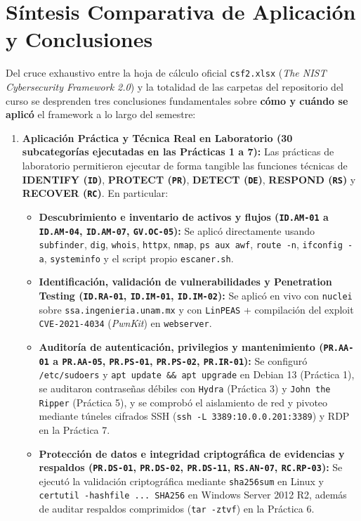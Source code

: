 \documentclass[letterpaper,11pt]{article}
\begin{document}
\section{Síntesis Comparativa de Aplicación y Conclusiones}

Del cruce exhaustivo entre la hoja de cálculo oficial \texttt{csf2.xlsx} (\textit{The NIST Cybersecurity Framework 2.0}) y la totalidad de las carpetas del repositorio del curso se desprenden tres conclusiones fundamentales sobre \textbf{cómo y cuándo se aplicó} el framework a lo largo del semestre:

\begin{enumerate}[leftmargin=1.1cm, itemsep=4pt]
    \item \textbf{Aplicación Práctica y Técnica Real en Laboratorio (\textbf{30 subcategorías} ejecutadas en las Prácticas 1 a 7):}
    Las prácticas de laboratorio permitieron ejecutar de forma tangible las funciones técnicas de \textbf{IDENTIFY (\texttt{ID})}, \textbf{PROTECT (\texttt{PR})}, \textbf{DETECT (\texttt{DE})}, \textbf{RESPOND (\texttt{RS})} y \textbf{RECOVER (\texttt{RC})}. En particular:
    \begin{itemize}[leftmargin=0.8cm, itemsep=2pt]
        \item \textbf{Descubrimiento e inventario de activos y flujos (\texttt{ID.AM-01} a \texttt{ID.AM-04}, \texttt{ID.AM-07}, \texttt{GV.OC-05}):} Se aplicó directamente usando \texttt{subfinder}, \texttt{dig}, \texttt{whois}, \texttt{httpx}, \texttt{nmap}, \texttt{ps aux awf}, \texttt{route -n}, \texttt{ifconfig -a}, \texttt{systeminfo} y el script propio \texttt{escaner.sh}.
        \item \textbf{Identificación, validación de vulnerabilidades y Penetration Testing (\texttt{ID.RA-01}, \texttt{ID.IM-01}, \texttt{ID.IM-02}):} Se aplicó en vivo con \texttt{nuclei} sobre \texttt{ssa.ingenieria.unam.mx} y con \texttt{LinPEAS} + compilación del exploit \texttt{CVE-2021-4034} (\textit{PwnKit}) en \texttt{webserver}.
        \item \textbf{Auditoría de autenticación, privilegios y mantenimiento (\texttt{PR.AA-01} a \texttt{PR.AA-05}, \texttt{PR.PS-01}, \texttt{PR.PS-02}, \texttt{PR.IR-01}):} Se configuró \texttt{/etc/sudoers} y \texttt{apt update \&\& apt upgrade} en Debian 13 (Práctica 1), se auditaron contraseñas débiles con \texttt{Hydra} (Práctica 3) y \texttt{John the Ripper} (Práctica 5), y se comprobó el aislamiento de red y pivoteo mediante túneles cifrados SSH (\texttt{ssh -L 3389:10.0.0.201:3389}) y RDP en la Práctica 7.
        \item \textbf{Protección de datos e integridad criptográfica de evidencias y respaldos (\texttt{PR.DS-01}, \texttt{PR.DS-02}, \texttt{PR.DS-11}, \texttt{RS.AN-07}, \texttt{RC.RP-03}):} Se ejecutó la validación criptográfica mediante \texttt{sha256sum} en Linux y \texttt{certutil -hashfile ... SHA256} en Windows Server 2012 R2, además de auditar respaldos comprimidos (\texttt{tar -ztvf}) en la Práctica 6.
    \end{itemize}


\end{enumerate}
\end{document}
